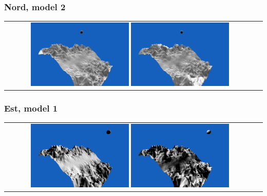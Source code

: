 \documentclass[a4paper]{article}
\begin{document}
\subsubsection{Nord, model 2}
\begin{tabular}{cc}
\includegraphics[width=0.4\textwidth]{Images/Essais/Essai_11_phong_North_1.png}
\includegraphics[width=0.4\textwidth]{Images/Essais/Essai_11_slint_North_1.png}
\end{tabular}
\subsubsection{Est, model 1}
\begin{tabular}{cc}
\includegraphics[width=0.4\textwidth]{Images/Essais/Essai_11_phong_East_0.png}
\includegraphics[width=0.4\textwidth]{Images/Essais/Essai_11_slint_East_0.png}
\end{tabular}
\end{document}
